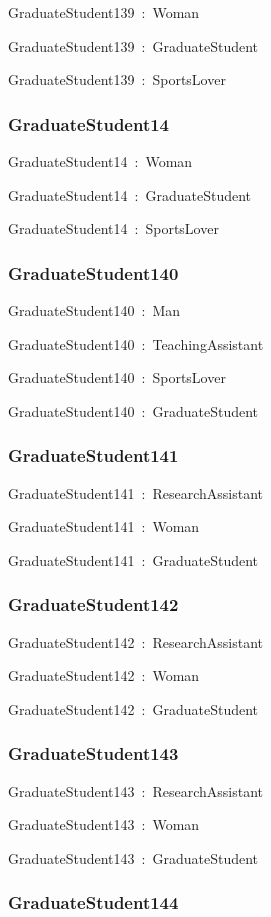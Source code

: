\documentclass{article}
\begin{document}
GraduateStudent139~:~Woman

GraduateStudent139~:~GraduateStudent

GraduateStudent139~:~SportsLover

\subsubsection*{GraduateStudent14}

GraduateStudent14~:~Woman

GraduateStudent14~:~GraduateStudent

GraduateStudent14~:~SportsLover

\subsubsection*{GraduateStudent140}

GraduateStudent140~:~Man

GraduateStudent140~:~TeachingAssistant

GraduateStudent140~:~SportsLover

GraduateStudent140~:~GraduateStudent

\subsubsection*{GraduateStudent141}

GraduateStudent141~:~ResearchAssistant

GraduateStudent141~:~Woman

GraduateStudent141~:~GraduateStudent

\subsubsection*{GraduateStudent142}

GraduateStudent142~:~ResearchAssistant

GraduateStudent142~:~Woman

GraduateStudent142~:~GraduateStudent

\subsubsection*{GraduateStudent143}

GraduateStudent143~:~ResearchAssistant

GraduateStudent143~:~Woman

GraduateStudent143~:~GraduateStudent

\subsubsection*{GraduateStudent144}
\end{document}
